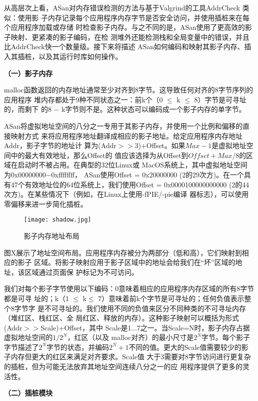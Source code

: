 从高层次上看，ASan对内存错误检测的方法与基于Valgrind的工具AddrCheck 类似：使用影
子内存记录每个应用程序内存字节是否安全访问，并使用插桩来在每个应用程序加载或存储
时检查影子内存。与之不同的是，ASan使用了更高效的影子映射、更紧凑的影子编码，在检
测堆外还能检测栈和全局变量中的错误，并且比AddrCheck快一个数量级。接下来将描述
ASan如何编码和映射其影子内存、插入其插桩，以及其运行时库如何操作。

\textbf{（一）影子内存}

malloc函数返回的内存地址通常至少对齐到8字节。这导致任何对齐的8字节序列的应用程序
堆内存都处于9种不同状态之一：前k个（0 $\leq$ k $\leq$ 8）字节是可寻址的，而剩下
的8 $-$ k字节则不是。这种状态可以编码成一个影子内存的单字节。

ASan将虚拟地址空间的八分之一专用于其影子内存，并使用一个比例和偏移的直接映射方式
来将应用程序地址翻译成相应的影子地址。给定应用程序内存地址Addr，影子字节的地址计
算为(Addr$>>$3)+Offset。如果$Max-1$是虚拟地址空间中的最大有效地址，那么Offset的
值应该选择为从Offset到$Offset+Max/8$的区域在启动时不被占用。在典型的32位Linux或
MacOS系统上，其中虚拟地址空间为0x00000000$-$0xffffffff， ASan使用Offset =
0x20000000 (2的29次方)。在一个具有47个有效地址位的64位系统上，我们使用Offset =
0x0000100000000000 (2的44次方)。在某些情况下（例如，在Linux上使用-fPIE/-pie编译
器标志），可以使用零偏移来进一步简化插桩。
\begin{figure}[ht]
	\centering
	\texttt{[image: shadow.jpg]}
	\caption{影子内存地址布局}
	\label{fig:shadow}
\end{figure}

图X展示了地址空间布局。应用程序内存被分为两部分（低和高），它们映射到相应的影子
区域。将影子映射应用于影子区域中的地址会给我们在“坏”区域的地址，该区域通过页面保
护标记为不可访问。

我们对每个影子字节使用以下编码：0意味着相应的应用程序内存区域的所有8字节都是可寻
址的；k（1 $\leq$ k$\leq$ 7）意味着前k个字节是可寻址的；任何负值表示整个8字节字
是不可寻址的。我们使用不同的负值来区分不同种类的不可寻址内存（堆红区、栈红区、全
局红区、释放的内存）。这种影子映射可以概括为形式(Addr$>>$Scale)+Offset，其中
Scale是1...7之一。当Scale=N时，影子内存占据虚拟地址空间的$1/2^N$，红区（以及
malloc对齐）的最小尺寸是$2^N$字节。每个影子字节描述了$2^N$字节的状态，并编码$2^N
+1$不同的值。更大的Scale值需要较少的影子内存但更大的红区来满足对齐要求。Scale值
大于3需要对8字节访问进行更复杂的插桩，但为可能无法放弃其地址空间连续八分之一的应
用程序提供了更多的灵活性。

\textbf{（二）插桩模块}

